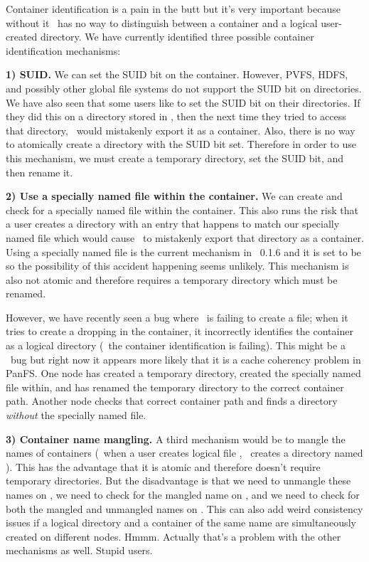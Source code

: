 \documentclass[10pt]{article}
\begin{document}
Container identification is a pain in the butt but it's very important because 
without it \plfs\ has no way to distinguish between a container and a logical
user-created directory.  We have currently 
identified three possible container identification mechanisms:  

{\bf 1) SUID.}  We can set the SUID bit on the container.  However, PVFS, HDFS,
and possibly other global file systems do not support the SUID bit on 
directories.  We have also seen that some users like to set the SUID bit on
their directories.  If they did this on a directory stored in \plfs, then the
next time they tried to access that directory, \plfs\ would mistakenly export
it as a container.  Also, there is no way to atomically create a directory 
with the SUID bit set.  Therefore in order to use this mechanism, we must
create a temporary directory, set the SUID bit, and then rename it.

{\bf 2) Use a specially named file within the container.}  We can create and
check for a specially named file within the container.  This also runs the risk
that a user creates a directory with an entry that happens to match our
specially named file which would cause \plfs\ to mistakenly export that
directory as a container.  Using a specially named file is the current
mechanism in \plfs~0.1.6 and it is set to be  so the
possibility of this accident happening seems unlikely.  This mechanism is also
not atomic and therefore requires a temporary directory which must be renamed.

However, we have recently seen a bug where \plfs\ is failing to create a file;
when it tries to create a dropping in the container, it incorrectly identifies
the container as a logical directory (\ie\ the container identification is
failing).  This might be a \plfs\ bug but right now it appears more likely that
it is a cache coherency problem in PanFS.  One node has created a temporary
directory, created the specially named file within, and has renamed the
temporary directory to the correct container path.  Another node checks that
correct container path and finds a directory {\em without} the specially named
file.  

{\bf 3) Container name mangling.}  A third mechanism would be to mangle the
names of containers (\eg\ when a user creates logical file , \plfs\
creates a directory named ).  This has the
advantage that it is atomic and therefore doesn't require temporary
directories.  But the disadvantage is that we need to unmangle these names on
\syscall{readdir}, we need to check for the mangled name on \syscall{mkdir},
and we need to check for both the mangled and unmangled names on
\syscall{stat}.  This can also add weird consistency issues if a logical
directory and a container of the same name are simultaneously created on
different nodes.  Hmmm.  Actually that's a problem with the other mechanisms as
well.  Stupid users.
\end{document}
